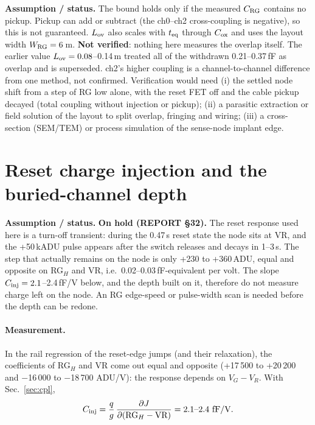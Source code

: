 \documentclass[10pt,a4paper]{article}
\newcommand{\caveat}[1]{\par\smallskip\noindent\colorbox{orange!10}{\parbox{\dimexpr\linewidth-2\fboxsep}{\small\textbf{Assumption / status.} #1}}\par\smallskip}
\begin{document}
\caveat{The bound holds only if the measured $C_{\rm RG}$ contains no pickup. Pickup can add or subtract (the ch0--ch2
cross-coupling is negative), so this is not guaranteed. $L_{\rm ov}$ also scales with $t_{\rm eq}$ through $C_{\rm ox}$
and uses the layout width $W_{\rm RG}=6$\,\textmu m. \textbf{Not verified}: nothing here measures the overlap itself.
The earlier value $L_{\rm ov}=0.08$--0.14\,\textmu m treated all of the withdrawn 0.21--0.37\,fF as overlap and is
superseded. ch2's higher coupling is a channel-to-channel difference from one method, not confirmed. Verification
would need (i) the settled node shift from a step of RG low alone, with the reset FET off and the cable pickup decayed
(total coupling without injection or pickup); (ii) a parasitic extraction or field solution of the layout to split
overlap, fringing and wiring; (iii) a cross-section (SEM/TEM) or process simulation of the sense-node implant edge.}

\section{Reset charge injection and the buried-channel depth}

\caveat{\textbf{On hold (REPORT \S32).} The reset response used here is a turn-off transient: during the 0.47\,\textmu s
reset state the node sits at VR, and the +50\,kADU pulse appears after the switch releases and decays in 1--3\,\textmu s.
The step that actually remains on the node is only +230 to +360\,ADU, equal and opposite on RG$_H$ and VR, i.e.\
0.02--0.03\,fF-equivalent per volt. The slope $C_{\rm inj}=2.1$--2.4\,fF/V below, and the depth built on it, therefore do
not measure charge left on the node. An RG edge-speed or pulse-width scan is needed before the depth can be redone.}

\paragraph{Measurement.} In the rail regression of the reset-edge jumps (and their relaxation), the coefficients of
RG$_H$ and VR come out equal and opposite (+17\,500 to +20\,200 and $-$16\,000 to $-$18\,700 ADU/V): the response depends
on $V_G-V_R$. With Sec.~\ref{sec:cpl},
\begin{equation}
C_{\rm inj}=\frac{q}{g}\,\frac{\partial J}{\partial(\text{RG}_H-\text{VR})}=2.1\text{--}2.4\ \text{fF/V}.
\end{equation}
\end{document}
